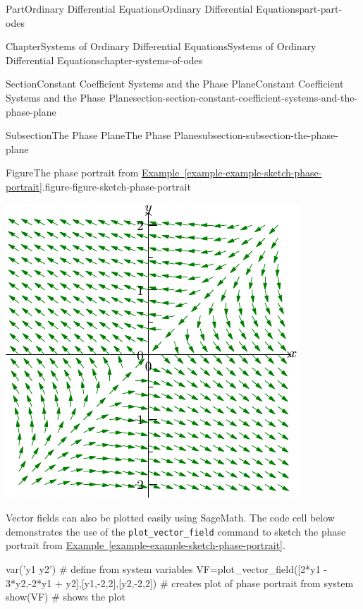 \documentclass[twoside,10pt,]{book}
\newcommand{\xreffont}{\relax}
\newcommand{\mono}[1]{\texttt{#1}}
\numberwithin{equation}{part}
\begin{document}
\begin{partptx}{Part}{Ordinary Differential Equations}{}{Ordinary Differential Equations}{}{}{part-part-odes}
\begin{chapterptx}{Chapter}{Systems of Ordinary Differential Equations}{}{Systems of Ordinary Differential Equations}{}{}{chapter-systems-of-odes}
\begin{sectionptx}{Section}{Constant Coefficient Systems and the Phase Plane}{}{Constant Coefficient Systems and the Phase Plane}{}{}{section-section-constant-coefficient-systems-and-the-phase-plane}
\begin{subsectionptx}{Subsection}{The Phase Plane}{}{The Phase Plane}{}{}{subsection-subsection-the-phase-plane}
\begin{figureptx}{Figure}{The phase portrait from \hyperref[example-example-sketch-phase-portrait]{Example~{\xreffont\ref{example-example-sketch-phase-portrait}}}.}{figure-figure-sketch-phase-portrait}{}
\begin{image}{0.25}{0.5}{0.25}{}
\includegraphics[width=\linewidth]{generated/asymptote/image-15.pdf}
\end{image}%
\tcblower
\end{figureptx}%
Vector fields can also be plotted easily using SageMath. The code cell below demonstrates the use of the \mono{plot\_vector\_field} command to sketch the phase portrait from \hyperref[example-example-sketch-phase-portrait]{Example~{\xreffont\ref{example-example-sketch-phase-portrait}}}.%
\begin{sageinput}
var('y1 y2') # define from system variables
VF=plot_vector_field([2*y1 - 3*y2,-2*y1 + y2],[y1,-2,2],[y2,-2,2]) # creates plot of phase portrait from system
show(VF) # shows the plot
\end{sageinput}

\end{subsectionptx}
\end{sectionptx}
\end{chapterptx}
\end{partptx}
\end{document}
